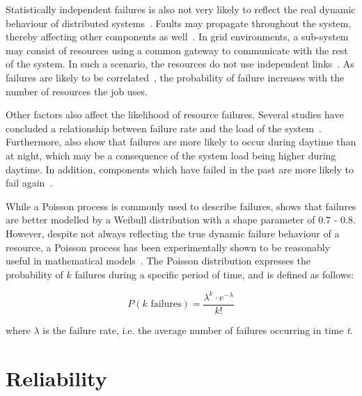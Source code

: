 \documentclass{cslthse-msc}
\begin{document}
Statistically independent failures is also not very likely to reflect the real dynamic behaviour of distributed systems~\cite{surveyReliabilityDistr, cloudServiceRel}. Faults may propagate throughout the system, thereby affecting other components as well~\cite{relGridSystems}. In grid environments, a sub-system may consist of resources using a common gateway to communicate with the rest of the system. In such a scenario, the resources do not use independent links~\cite{optResourceAllMaxPerformance}. As failures are likely to be correlated~\cite{perfImplPerCheckPoint}, the probability of failure increases with the number of resources the job uses.

Other factors also affect the likelihood of resource failures. Several studies have concluded a relationship between failure rate and the load of the system~\cite{studyOfFailures, implicationsOfFailures}. Furthermore, \cite{studyOfFailures, implicationsOfFailures} also show that failures are more likely to occur during daytime than at night, which may be a consequence of the system load being higher during daytime. In addition, components which have failed in the past are more likely to fail again~\cite{implicationsOfFailures}.

While a Poisson process is commonly used to describe failures, \cite{studyOfFailures} shows that failures are better modelled by a Weibull distribution with a shape parameter of 0.7 - 0.8. However, despite not always reflecting the true dynamic failure behaviour of a resource, a Poisson process has been experimentally shown to be reasonably useful in mathematical models~\cite{experimentalFailureAssessment}. The Poisson distribution expresses the probability of $k$ failures during a specific period of time, and is defined as follows:

\begin{equation} \label{eq:Poisson}
P(k \mbox{ failures}) = \dfrac{\lambda^k \cdot e^{-\lambda}}{k!}
\end{equation}

where $\lambda$ is the failure rate, i.e. the average number of failures occurring in time \emph{t}. 

\section{Reliability} \label{sec:background_reliability}
\end{document}
